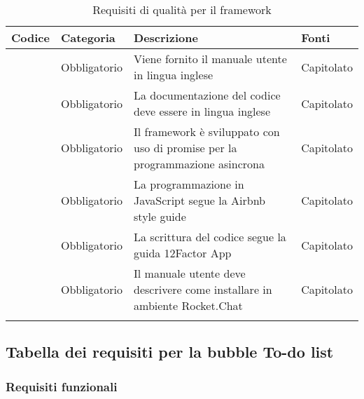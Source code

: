 \begin{longtable}{|P{1.5cm}|P{2.5cm}|P{6.5cm}|P{2.5cm}|}
	\hline \textbf{Codice} & \textbf{Categoria} & \textbf{Descrizione} & \textbf{Fonti} \\
	\hline \RequisitoObQ\label{L57} & Obbligatorio & Viene fornito il manuale utente in lingua inglese & Capitolato \\
	\hline \RequisitoObQ\label{L66} & Obbligatorio & La documentazione del codice deve essere in lingua inglese & Capitolato \\
	\hline \RequisitoObQ\label{L58} & Obbligatorio & Il framework è sviluppato con uso di promise per la programmazione asincrona & Capitolato \\
	\hline \RequisitoObQ\label{L59} & Obbligatorio & La programmazione in JavaScript segue la Airbnb style guide & Capitolato \\
	\hline \RequisitoObQ\label{L60} & Obbligatorio & La scrittura del codice segue la guida 12Factor App & Capitolato \\
	\hline \RequisitoObQ\label{L67} & Obbligatorio & Il manuale utente deve descrivere come installare \ProjectName{} in ambiente Rocket.Chat & Capitolato \\
	\hline
\caption{Requisiti di qualità per il framework}
\end{longtable}


\subsection{Tabella dei requisiti per la bubble To-do list}

\subsubsection{Requisiti funzionali}

